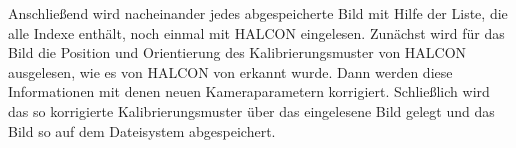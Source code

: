 Anschließend wird nacheinander jedes abgespeicherte Bild mit Hilfe der Liste, die alle Indexe enthält, noch einmal mit HALCON eingelesen. Zunächst wird für das Bild die Position und Orientierung des Kalibrierungsmuster von HALCON ausgelesen, wie es von HALCON von erkannt wurde. Dann werden diese Informationen mit denen neuen Kameraparametern korrigiert. Schließlich wird das so korrigierte Kalibrierungsmuster über das eingelesene Bild gelegt und das Bild so auf dem Dateisystem abgespeichert.

